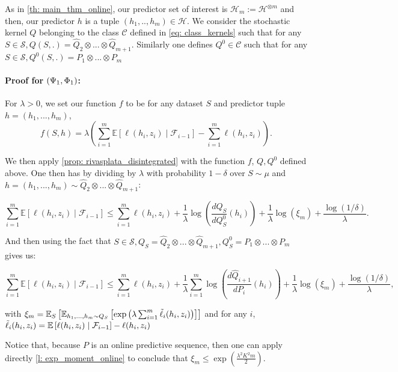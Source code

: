 \begin{noaddcontents}
As in \cref{th: main_thm_online}, our predictor set of interest is $\mathcal{H}_m:= \mathcal{H}^{\otimes m}$ and then, our predictor $h$ is a tuple $(h_1,..,h_m)\in\mathcal{H}$. We consider the stochastic kernel $Q$ belonging to the class $\mathcal{C}$ defined in \cref{eq: class_kernels} such that for any $S\in\mathcal{S}, Q(S,.) = \hat{Q}_2\otimes ... \otimes \hat{Q}_{m+1}$.
Similarly one defines $Q^0\in\mathcal{C}$ such that for any $S\in\mathcal{S}, Q^0(S,.) = P_1\otimes ... \otimes P_{m}$




\paragraph{Proof for $(\Psi_{\normalfont1},\Phi_{\normalfont1})$:}

For $\lambda>0$, we set our function $f$ to be for any dataset $S$ and predictor tuple $h=(h_1,...,h_m)$,
\[f(S,h) = \lambda \left(\sum_{i=1}^m \mathbb{E}\left[\ell(h_i,z_i)\mid \mathcal{F}_{i-1}\right]- \sum_{i=1}^m \ell(h_i,z_i) \right).\]

We then apply \cref{prop: rivasplata_disintegrated} with the function $f$, $Q,Q^0$ defined above. One then has by dividing by $\lambda$ with probability $1-\delta$ over $S\sim \mu$ and $h=(h_1,...,h_m)\sim \hat{Q}_2\otimes ... \otimes \hat{Q}_{m+1}$:

\[ \sum_{i=1}^m  \mathbb{E}[\ell(h_i,z_i) \mid \mathcal{F}_{i-1}]   \leq \sum_{i=1}^m  \ell(h_i,z_i)  + \frac{1}{\lambda}\log\left(\frac{dQ_S}{dQ_S^0}(h_i)\right) + \frac{1}{\lambda} \log(\xi_m) + \frac{\log(1/\delta)}{\lambda}. \]

And then using the fact that $S\in\mathcal{S}, Q_S = \hat{Q}_2\otimes ... \otimes \hat{Q}_{m+1}, Q^0_S = P_1\otimes ... \otimes P_{m}$ gives us:

\[ \sum_{i=1}^m  \mathbb{E}[\ell(h_i,z_i) \mid \mathcal{F}_{i-1}]   \leq \sum_{i=1}^m  \ell(h_i,z_i)  + \frac{1}{\lambda}\sum_{i=1}^m \log\left(\frac{d\hat{Q}_{i+1}}{dP_i}(h_i)\right) + \frac{1}{\lambda} \log(\xi_m) + \frac{\log(1/\delta)}{\lambda}, \]

with $  \xi_m = \mathbb{E}_S\left[\mathbb{E}_{h_1,...,h_m \sim Q_S} \left[\exp\left(\lambda \sum_{i=1}^m \Tilde{\ell}_i(h_i,z_i)\right)\right]\right]$ and for any $i$,
$ \Tilde{\ell}_i(h_i,z_i) = \mathbb{E}\left[\ell(h_i,z_i)\mid \mathcal{F}_{i-1}\right]-  \ell(h_i,z_i) $

Notice that, because $P$ is an online predictive sequence, then one can apply directly \cref{l: exp_moment_online} to conclude that $\xi_m \leq \exp \left( \frac{\lambda^2K^2m}{2} \right)$.


\end{noaddcontents}
